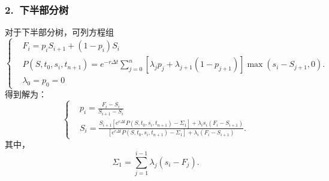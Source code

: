 \subsubsection{2. $\ $下半部分树}
对于下半部分树，可列方程组
\begin{equation*}
	\left\{
	\begin{aligned}
		& F_i = p_iS_{i+1}+(1-p_i)S_i \\
		& P(S,t_0,s_i,t_{n+1}) = e^{-r \Delta t}\sum_{j=0}^{n} \left[\lambda_jp_j+\lambda_{j+1}(1-p_{j+1})\right]\max(s_i-S_{j+1},0).\nonumber\\
		& \lambda_0 = p_0 = 0 \nonumber
	\end{aligned}
	\right.
\end{equation*}
得到解为：
\begin{equation}
	\label{eq5}
	\left\{
	\begin{aligned}
		& p_i = \frac{F_i-S_i}{S_{i+1}-S_i }\\
		& S_{i} = \frac{S_{i+1}\left[e^{r\Delta t}P(S,t_0,s_i,t_{n+1}) -\Sigma_1 \right]+\lambda_is_i(F_i-S_{i+1})}{\left[e^{r\Delta t}P(S,t_0,s_i,t_{n+1}) -\Sigma_1 \right]+\lambda_i(F_i-S_{i+1})}.
	\end{aligned}
	\right.
\end{equation}
其中，$$\Sigma_1 = \sum_{j=1}^{i-1}\lambda_j(s_i-F_j).$$
